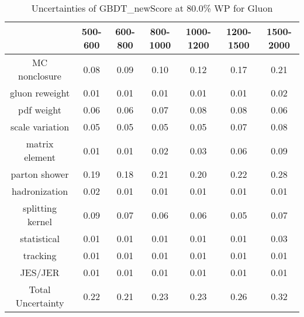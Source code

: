 \begin{table}
\centering
\caption{Uncertainties of GBDT_newScore at 80.0\% WP for Gluon}
\label{tab:syst_GBDT_newScore_0.8_Gluon}
\begin{tabular}{ccccccc}
\toprule
{} &  500-600 &  600-800 &  800-1000 &  1000-1200 &  1200-1500 &  1500-2000 \\
\midrule
MC nonclosure     &     0.08 &     0.09 &      0.10 &       0.12 &       0.17 &       0.21 \\
gluon reweight    &     0.01 &     0.01 &      0.01 &       0.01 &       0.01 &       0.02 \\
pdf weight        &     0.06 &     0.06 &      0.07 &       0.08 &       0.08 &       0.06 \\
scale variation   &     0.05 &     0.05 &      0.05 &       0.05 &       0.07 &       0.08 \\
matrix element    &     0.01 &     0.01 &      0.02 &       0.03 &       0.06 &       0.09 \\
parton shower     &     0.19 &     0.18 &      0.21 &       0.20 &       0.22 &       0.28 \\
hadronization     &     0.02 &     0.01 &      0.01 &       0.01 &       0.01 &       0.01 \\
splitting kernel  &     0.09 &     0.07 &      0.06 &       0.06 &       0.05 &       0.07 \\
statistical       &     0.01 &     0.01 &      0.01 &       0.01 &       0.01 &       0.03 \\
tracking          &     0.01 &     0.01 &      0.01 &       0.01 &       0.01 &       0.01 \\
JES/JER           &     0.01 &     0.01 &      0.01 &       0.01 &       0.01 &       0.01 \\
Total Uncertainty &     0.22 &     0.21 &      0.23 &       0.23 &       0.26 &       0.32 \\
\bottomrule
\end{tabular}
\end{table}
